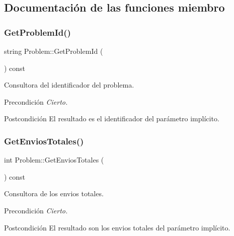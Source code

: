 \subsection{Documentación de las funciones miembro}
\mbox{\label{class_problem_a953ef8047cd489d36f4a96d10baed4af}} 
\subsubsection{\texorpdfstring{Get\+Problem\+Id()}{GetProblemId()}}
{\footnotesize\ttfamily string Problem\+::\+Get\+Problem\+Id (\begin{DoxyParamCaption}{ }\end{DoxyParamCaption}) const}



Consultora del identificador del problema. 

\begin{DoxyPrecond}{Precondición}
{\itshape Cierto.} 
\end{DoxyPrecond}
\begin{DoxyPostcond}{Postcondición}
El resultado es el identificador del parámetro implícito. 
\end{DoxyPostcond}
\mbox{\label{class_problem_af97fede267d1b9881854f7d8da7be49a}} 
\subsubsection{\texorpdfstring{Get\+Envios\+Totales()}{GetEnviosTotales()}}
{\footnotesize\ttfamily int Problem\+::\+Get\+Envios\+Totales (\begin{DoxyParamCaption}{ }\end{DoxyParamCaption}) const}



Consultora de los envios totales. 

\begin{DoxyPrecond}{Precondición}
{\itshape Cierto.} 
\end{DoxyPrecond}
\begin{DoxyPostcond}{Postcondición}
El resultado son los envios totales del parámetro implícito. 
\end{DoxyPostcond}
\mbox{\label{class_problem_aff1a49d7c06873886905fc01b5ca024c}} 
